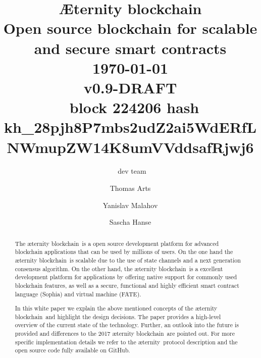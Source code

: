 \documentclass{article}
\author{\aet\ dev team  \and Thomas Arts \and
             Yanislav Malahov \and Sascha Hanse}
\title{\huge Æternity blockchain  \\[0.5em] \large Open source blockchain for scalable and secure smart contracts  \\[1em]\today \\[1em] v0.9-DRAFT \\[0.4em] \blockchain\ block 224206 hash kh_28pjh8P7mbs2udZ2ai5WdERfLNWmupZW14K8umVVddsafRjwj6}
\newcommand{\blockchain}{{\ae}ternity blockchain}
\newcommand{\aet}{{\ae}ternity}
\begin{document}
\maketitle


%
\begin{abstract}
The \blockchain\ is a open source development platform for advanced blockchain
applications that can be used by millions of users.
On the one hand the \blockchain\ is scalable due to the use of state 
channels and a next generation consensus algorithm. On the other hand,
the \blockchain\ is a excellent development platform for
applications by offering native support for commonly used
blockchain features, as well as a secure, functional and highly efficient
smart contract language (Sophia) and virtual machine (FATE). 

In this white paper we explain the above mentioned concepts of the
\blockchain\ and highlight the design decisions. The
paper provides a high-level overview of the current state of the
technology. Further, an outlook into the future is provided and differences
to the 2017 \blockchain\ are pointed out. For more specific implementation 
details we refer to the \aet\ protocol description
and the open source code fully available on GitHub. 

\end{abstract}


\newpage

\tableofcontents

\newpage








 
\end{document}
